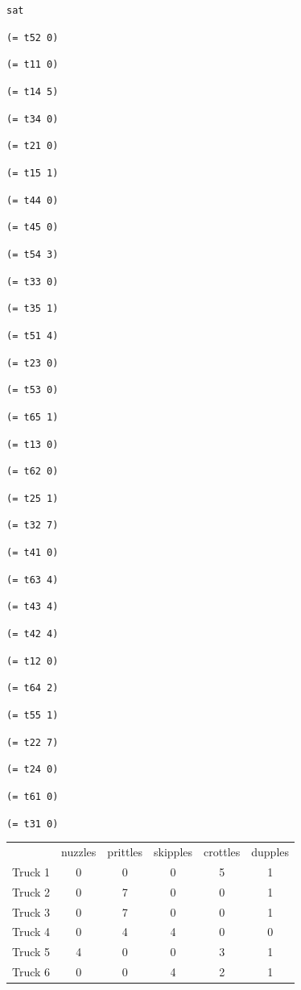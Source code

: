 \documentclass[11pt]{article}
\begin{document}
{\footnotesize

{\tt sat

{\tt (= t52 0)}

{\tt (= t11 0)}

{\tt (= t14 5)}

{\tt (= t34 0)}

{\tt (= t21 0)}

{\tt (= t15 1)}

{\tt (= t44 0)}

{\tt (= t45 0)}

{\tt (= t54 3)}

{\tt (= t33 0)}

{\tt (= t35 1)}

{\tt (= t51 4)}

{\tt (= t23 0)}

{\tt (= t53 0)}

{\tt (= t65 1)}

{\tt (= t13 0)}

{\tt (= t62 0)}

{\tt (= t25 1)}

{\tt (= t32 7)}

{\tt (= t41 0)}

{\tt (= t63 4)}

{\tt (= t43 4)}

{\tt (= t42 4)}

{\tt (= t12 0)}

{\tt (= t64 2)}

{\tt (= t55 1)}

{\tt (= t22 7)}

{\tt (= t24 0)}

{\tt (= t61 0)}

{\tt (= t31 0)}

}

\begin{table}
  \centering
  \begin{tabular}{|l|c|c|c|c|c|}
    \hline
     & nuzzles & prittles & skipples & crottles & dupples \\
    Truck 1 & 0 & 0 & 0 & 5 & 1 \\
    Truck 2 & 0 & 7 & 0 & 0 & 1 \\
    Truck 3 & 0 & 7 & 0 & 0 & 1 \\
    Truck 4 & 0 & 4 & 4 & 0 & 0 \\
    Truck 5 & 4 & 0 & 0 & 3 & 1 \\
    Truck 6 & 0 & 0 & 4 & 2 & 1 \\
    \hline
  \end{tabular}
\end{table}

}
\end{document}
